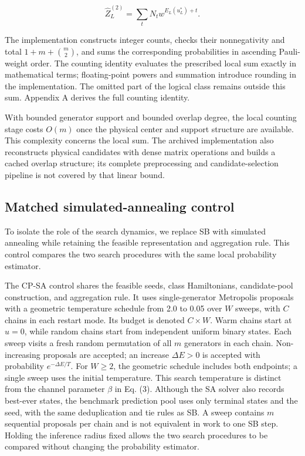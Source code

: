 \documentclass[aps,prapplied,reprint,superscriptaddress,amsmath,amssymb,floatfix,nofootinbib]{revtex4-2}
\begin{document}
\[
\widehat Z_L^{(2)}=\sum_t N_t w^{E_L(u_L^*)+t}.
\]

The implementation constructs integer counts, checks their nonnegativity
and total \(1+m+\binom m2\), and sums the corresponding probabilities in
ascending Pauli-weight order. The counting identity evaluates the
prescribed local sum exactly in mathematical terms; floating-point
powers and summation introduce rounding in the implementation. The
omitted part of the logical class remains outside this sum. Appendix A
derives the full counting identity.

With bounded generator support and bounded overlap degree, the local
counting stage costs \(O(m)\) once the physical center and support
structure are available. This complexity concerns the local sum. The
archived implementation also reconstructs physical candidates with dense
matrix operations and builds a cached overlap structure; its complete
preprocessing and candidate-selection pipeline is not covered by that
linear bound.

\subsection{Matched simulated-annealing
control}\label{f.-matched-simulated-annealing-control}

To isolate the role of the search dynamics, we replace SB with simulated
annealing while retaining the feasible representation and aggregation
rule. This control compares the two search procedures with the same
local probability estimator.

The CP-SA control shares the feasible seeds, class Hamiltonians,
candidate-pool construction, and aggregation rule. It uses
single-generator Metropolis proposals with a geometric temperature
schedule from 2.0 to 0.05 over \(W\) sweeps, with \(C\) chains in each
restart mode. Its budget is denoted \(C\times W\). Warm chains start at
\(u=0\), while random chains start from independent uniform binary
states. Each sweep visits a fresh random permutation of all \(m\)
generators in each chain. Non-increasing proposals are accepted; an
increase \(\Delta E>0\) is accepted with probability
\(e^{-\Delta E/T}\). For \(W\ge2\), the geometric schedule includes both
endpoints; a single sweep uses the initial temperature. This search
temperature is distinct from the channel parameter \(\beta\) in Eq. (3).
Although the SA solver also records best-ever states, the benchmark
prediction pool uses only terminal states and the seed, with the same
deduplication and tie rules as SB. A sweep contains \(m\) sequential
proposals per chain and is not equivalent in work to one SB step.
Holding the inference radius fixed allows the two search procedures to
be compared without changing the probability estimator.
\end{document}
